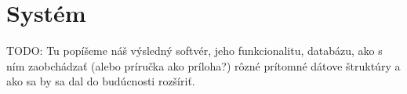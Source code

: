 \chapter{Systém}
TODO: Tu popíšeme náš výsledný softvér, jeho funkcionalitu, databázu, ako s ním zaobchádzať (alebo príručka ako príloha?)
rôzné prítomné dátove štruktúry a ako sa by sa dal do budúcnosti rozšíriť.
